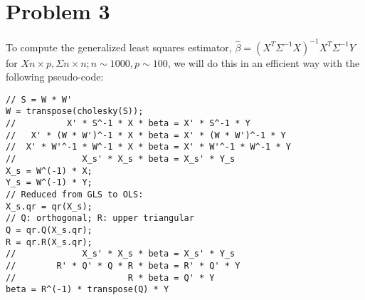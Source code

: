 \documentclass{article}\usepackage{graphicx, color}
\begin{document}
\newpage
\section*{Problem 3}
To compute the generalized least squares estimator, 
$\hat\beta = (X^T\Sigma^{-1}X)^{-1}X^T\Sigma^{-1}Y$
for $X n\times p, \Sigma n\times n; n\sim 1000, p\sim 100$, we will
do this in an efficient way with the following pseudo-code:

\begin{lstlisting}
// S = W * W'
W = transpose(cholesky(S)); 
//          X' * S^-1 * X * beta = X' * S^-1 * Y
//   X' * (W * W')^-1 * X * beta = X' * (W * W')^-1 * Y
//  X' * W'^-1 * W^-1 * X * beta = X' * W'^-1 * W^-1 * Y
//             X_s' * X_s * beta = X_s' * Y_s			
X_s = W^(-1) * X;
Y_s = W^(-1) * Y;
// Reduced from GLS to OLS:
X_s.qr = qr(X_s); 
// Q: orthogonal; R: upper triangular
Q = qr.Q(X_s.qr);  
R = qr.R(X_s.qr); 
//             X_s' * X_s * beta = X_s' * Y_s			
//        R' * Q' * Q * R * beta = R' * Q' * Y
//                      R * beta = Q' * Y
beta = R^(-1) * transpose(Q) * Y
\end{lstlisting}
\end{document}
